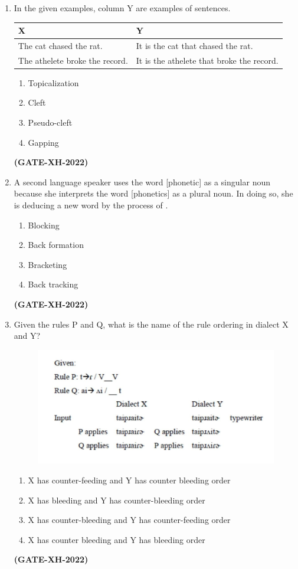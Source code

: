 \documentclass[journal]{IEEEtran}
\begin{document}
\begin{enumerate}
\item In the given examples, column Y are examples of \underline{\hspace{2cm}} sentences.  
\begin{tabular}{|p{5cm}|p{6cm}|}
\hline
   X  &  Y\\
   \hline
    The cat chased the rat. & It is the cat that chased the rat.\\
    \hline
    The athelete broke the record. & It is the athelete that broke the record.\\
    \hline
\end{tabular}
\begin{multicols}{4}
\begin{enumerate}
\item Topicalization  
\item Cleft  
\item Pseudo-cleft  
\item Gapping  
\end{enumerate}
\end{multicols}
\hfill\textbf{(GATE-XH-2022)}

\item A second language speaker uses the word [phonetic] as a singular noun because she interprets the word [phonetics] as a plural noun. In doing so, she is deducing a new word by the process of \underline{\hspace{2cm}}.
\begin{multicols}{4}
\begin{enumerate}
\item Blocking  
\item Back formation  
\item Bracketing  
\item Back tracking  
\end{enumerate}
\end{multicols}
\hfill\textbf{(GATE-XH-2022)}
\item Given the rules P and Q, what is the name of the rule ordering in dialect X and Y?  
\begin{figure}[h!]
    \centering
    \includegraphics[width=0.6\columnwidth]{figs/Q.125.jpeg}
    \label{Q.125}
\end{figure}
\begin{enumerate}
\item X has counter-feeding and Y has counter bleeding order  
\item X has bleeding and Y has counter-bleeding order  
\item X has counter-bleeding and Y has counter-feeding order  
\item X has counter bleeding and Y has bleeding order  
\end{enumerate}
\hfill\textbf{(GATE-XH-2022)}


\end{enumerate}
\end{document}
